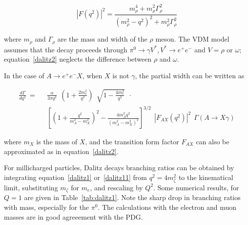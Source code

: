 \documentclass[12pt]{article}
\begin{document}
\begin{equation}
  |F(q^2)|^2 = \frac{m^4_\rho + m^2_\rho \Gamma^2_\rho}{(m_\rho^2 - q^2)^2 + m^2_\rho \Gamma^2_\rho}
  \label{dalitz2}
\end{equation}

\noindent where $m_\rho$ and $\Gamma_\rho$ are the mass and width of the
$\rho$ meson.  The VDM model assumes that the decay proceeds through
$\pi^0 \to \gamma V^*, V^* \to e^+e^-$ and $V= \rho$ or $\omega$;
equation~\ref{dalitz2} neglects the difference between $\rho$ and $\omega$.

In the case of $A \to e^+ e^- X$, when $X$ is not $\gamma$, the
partial width can be written as 

\begin{equation}
\begin{split}
\frac{d \Gamma}{d q^2}  ~=~~~ & \frac{\alpha}{3 \pi q^2}~~
(1+\frac{2m_e^2}{q^2})~~\sqrt{1 - \frac{4m_e^2}{q^2}}~~ \cdot \\
& \left [ (1+\frac{q^2}{m_A^2-m_X^2})^2 - \frac{4
    m_A^2q^2}{(m_A^2-m_X^2)^2}\right ]^{3/2}~~
|F_{AX}(q^2)|^2 ~~
\Gamma(A \to X \gamma) 
\label{dalitz11}
\end{split}
\end{equation}

\noindent where $m_X$ is the mass of $X$, and the
transition
form factor $F_{AX}$ can also be approximated as in equation~\ref{dalitz2}.

For millicharged particles, Dalitz decays branching ratios 
can be obtained by integrating equation~\ref{dalitz1} or~\ref{dalitz11}
from 
$q^2=4m^2_\zeta$ to the kinematical limit, substituting $m_\zeta$ for 
$m_e$, and rescaling by $Q^2$.
Some numerical results, for $Q=1$ are given in Table~\ref{tab:dalitz1}.  Note the
sharp drop in branching ratios with mass, especially for the $\pi^0$.
The calculations
with the electron and muon masses are in good agreeement with the PDG.
\end{document}
